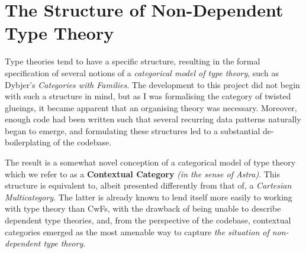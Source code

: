 \documentclass{article}[9pt]
\begin{document}
\section{The Structure of Non-Dependent Type Theory}

Type theories tend to have a specific structure, resulting in the formal
specification of several notions of a \emph{categorical model of type theory},
such as Dybjer's \emph{Categories with Families}. The development to this
project did not begin with such a structure in mind, but as I was formalising
the category of twisted glueings, it became apparent that an organising theory
was necessary. Moreover, enough code had been written such that several
recurring data patterns naturally began to emerge, and formulating these
structures led to a substantial de-boilerplating of the codebase.

The result is a somewhat novel conception of a categorical model of type theory
which we refer to as a \textbf{Contextual Category} \emph{(in the sense of
Astra)}. This structure is equivalent to, albeit presented differently from that
of, a \emph{Cartesian Multicategory}. The latter is already known to lend itself
more easily to working with type theory than CwFs, with the drawback of being
unable to describe dependent type theories, and, from the perspective of the
codebase, contextual categories emerged as the most amenable way to capture
\emph{the situation of non-dependent type theory}.








\end{document}
